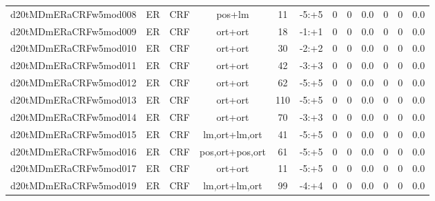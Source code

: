 \documentclass[a4paper]{article}
\begin{document}
\begin{landscape}
\begin{center}
\begin{tabular}{ |c|c|c|c|c|c|c|c|c|c|c|c|}
 
 	
 	\small{ d20tMDmERaCRFw5mod008 } & ER & CRF & pos+lm  &  11 &  -5:+5  &  0 & 0 & 0.0  &  0 & 0 & 0.0 \\
 	

 
 	
 	\small{ d20tMDmERaCRFw5mod009 } & ER & CRF & ort+ort  &  18 &  -1:+1  &  0 & 0 & 0.0  &  0 & 0 & 0.0 \\
 	

 
 	
 	\small{ d20tMDmERaCRFw5mod010 } & ER & CRF & ort+ort  &  30 &  -2:+2  &  0 & 0 & 0.0  &  0 & 0 & 0.0 \\
 	

 
 	
 	\small{ d20tMDmERaCRFw5mod011 } & ER & CRF & ort+ort  &  42 &  -3:+3  &  0 & 0 & 0.0  &  0 & 0 & 0.0 \\
 	

 
 	
 	\small{ d20tMDmERaCRFw5mod012 } & ER & CRF & ort+ort  &  62 &  -5:+5  &  0 & 0 & 0.0  &  0 & 0 & 0.0 \\
 	

 
 	
 	\small{ d20tMDmERaCRFw5mod013 } & ER & CRF & ort+ort  &  110 &  -5:+5  &  0 & 0 & 0.0  &  0 & 0 & 0.0 \\
 	

 
 	
 	\small{ d20tMDmERaCRFw5mod014 } & ER & CRF & ort+ort  &  70 &  -3:+3  &  0 & 0 & 0.0  &  0 & 0 & 0.0 \\
 	

 
 	
 	\small{ d20tMDmERaCRFw5mod015 } & ER & CRF & lm,ort+lm,ort  &  41 &  -5:+5  &  0 & 0 & 0.0  &  0 & 0 & 0.0 \\
 	

 
 	
 	\small{ d20tMDmERaCRFw5mod016 } & ER & CRF & pos,ort+pos,ort  &  61 &  -5:+5  &  0 & 0 & 0.0  &  0 & 0 & 0.0 \\
 	

 
 	
 	\small{ d20tMDmERaCRFw5mod017 } & ER & CRF & ort+ort  &  11 &  -5:+5  &  0 & 0 & 0.0  &  0 & 0 & 0.0 \\
 	

 
 	
 	\small{ d20tMDmERaCRFw5mod019 } & ER & CRF & lm,ort+lm,ort  &  99 &  -4:+4  &  0 & 0 & 0.0  &  0 & 0 & 0.0 \\
 	


\end{tabular}
\end{center}
\end{landscape}
\end{document}
